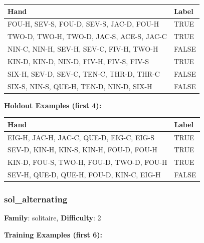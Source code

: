 \documentclass[10pt,a4paper]{article}
\begin{document}
\begin{small}
\begin{tabular}{p{8cm}l}
\toprule
Hand & Label \\
\midrule
FOU-H, SEV-S, FOU-D, SEV-S, JAC-D, FOU-H & \textcolor{positive}{TRUE} \\
TWO-D, TWO-H, TWO-D, JAC-S, ACE-S, JAC-C & \textcolor{positive}{TRUE} \\
NIN-C, NIN-H, SEV-H, SEV-C, FIV-H, TWO-H & \textcolor{negative}{FALSE} \\
KIN-D, KIN-D, NIN-D, FIV-H, FIV-S, FIV-S & \textcolor{positive}{TRUE} \\
SIX-H, SEV-D, SEV-C, TEN-C, THR-D, THR-C & \textcolor{negative}{FALSE} \\
SIX-S, NIN-S, QUE-H, TEN-D, NIN-D, SIX-H & \textcolor{negative}{FALSE} \\
\bottomrule
\end{tabular}
\end{small}

\textbf{Holdout Examples (first 4):}

\begin{small}
\begin{tabular}{p{8cm}l}
\toprule
Hand & Label \\
\midrule
EIG-H, JAC-H, JAC-C, QUE-D, EIG-C, EIG-S & \textcolor{positive}{TRUE} \\
SEV-D, KIN-H, KIN-S, KIN-H, FOU-D, FOU-H & \textcolor{positive}{TRUE} \\
KIN-D, FOU-S, TWO-H, FOU-D, TWO-D, FOU-H & \textcolor{positive}{TRUE} \\
SEV-H, QUE-D, QUE-H, FOU-D, KIN-C, EIG-H & \textcolor{negative}{FALSE} \\
\bottomrule
\end{tabular}
\end{small}

\vspace{0.5cm}

\subsubsection{sol\_alternating}

\textbf{Family}: solitaire, \textbf{Difficulty}: 2

\textbf{Training Examples (first 6):}
\end{document}
